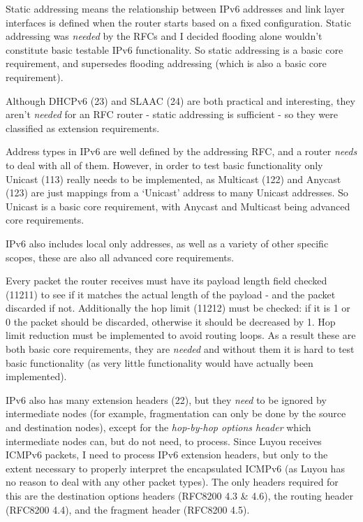 \documentclass[12pt,a4paper,twoside,openany]{report}
\begin{document}
Static addressing means the relationship between IPv6 addresses and link layer interfaces is defined when the router starts based on a fixed configuration.  Static addressing was \textit{needed} by the RFCs and I decided flooding alone wouldn't constitute basic testable IPv6 functionality. So static addressing is a basic core requirement, and supersedes flooding addressing (which is also a basic core requirement).

Although DHCPv6 (23) and SLAAC (24) are both practical and interesting, they aren't \textit{needed} for an RFC router - static addressing is sufficient - so they were classified as extension requirements.  

Address types in IPv6 are well defined by the addressing RFC\cite{ipv6_rfc_adr}, and a router \textit{needs} to deal with all of them.  However, in order to test basic functionality only Unicast (113) really needs to be implemented, as Multicast (122) and Anycast (123) are just mappings from a `Unicast' address to many Unicast addresses. So Unicast is a basic core requirement, with Anycast and Multicast being advanced core requirements. 

IPv6 also includes local only addresses, as well as a variety of other specific scopes, these are also all advanced core requirements.

\bigskip

Every packet the router receives must have its payload length field checked (11211) to see if it matches the actual length of the payload - and the packet discarded if not.  Additionally the hop limit (11212) must be checked: if it is 1 or 0 the packet should be discarded, otherwise it should be decreased by 1. Hop limit reduction must be implemented to avoid routing loops. As a result these are both basic core requirements, they are \textit{needed} and without them it is hard to test basic functionality (as very little functionality would have actually been implemented).

IPv6 also has many extension headers (22), but they \textit{need} to be ignored by intermediate nodes (for example, fragmentation can only be done by the source and destination nodes), except for the \textit{hop-by-hop options header} which intermediate nodes can, but do not need, to process\cite{ipv6_rfc}. Since Luyou receives ICMPv6 packets, I need to process IPv6 extension headers, but only to the extent necessary to properly interpret the encapsulated ICMPv6 (as Luyou has no reason to deal with any other packet types).  The only headers required for this are the destination options headers (RFC8200 4.3 \& 4.6\cite{ipv6_rfc}), the routing header (RFC8200 4.4\cite{ipv6_rfc}), and the fragment header (RFC8200 4.5\cite{ipv6_rfc}).
\end{document}
